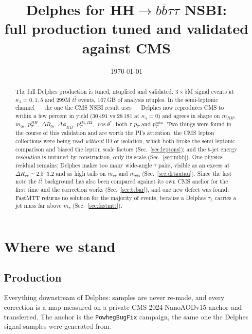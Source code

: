 \documentclass[11pt,a4paper]{article}
\title{\vspace{-1.5cm}Delphes for HH$\rightarrow b\bar b\tau\tau$ NSBI:\\
\large full production tuned and validated against CMS}
\author{}
\date{\today}
\newcommand{\tauh}{\tau_{h}}
\newcommand{\mtautau}{m_{\tau\tau}}
\newcommand{\mvis}{m_{\mathrm{vis}}}
\newcommand{\mtau}{m_{\tau}}
\newcommand{\kl}{\kappa_{\lambda}}
\newcommand{\dR}{\Delta R}
\newcommand{\ptmiss}{p_{T}^{\mathrm{miss}}}
\begin{document}
\maketitle
\vspace{-0.8cm}

\begin{abstract}
\noindent
The full Delphes production is tuned, ntuplised and validated: $3\times5$M signal events at
$\kl=0,1,5$ and $299$M $t\bar t$ events, $167\,$GB of analysis ntuples. In the
semi-leptonic channel --- the one the CMS NSBI result uses --- Delphes now reproduces CMS
to within a few percent in yield ($30\,491$ vs $28\,181$ at $\kl=0$) and agrees in shape on
$m_{HH}$, $m_{bb}$, $p_{T}^{HH}$, $\dR_{bb}$, $\Delta\phi_{HH}$, $p_{T}^{H1,H2}$,
$\cos\theta^{*}$, both $\tau$ $p_{T}$ and $\ptmiss$. Two things were found in the course of
this validation and are worth the PI's attention: the CMS lepton collections were being read
\emph{without} ID or isolation, which both broke the semi-leptonic comparison and biased the
lepton scale factors (Sec.~\ref{sec:leptons}); and the $b$-jet energy \emph{resolution} is
untuned by construction, only its scale (Sec.~\ref{sec:mbb}). One physics residual remains:
Delphes makes too many wide-angle $\tau$ pairs, visible as an excess at
$\dR_{\tau\tau}\simeq2.5$--$3.2$ and as high tails on $\mtautau$ and $\mvis$
(Sec.~\ref{sec:drtautau}). Since the last note the $t\bar t$ background has also been
compared against its own CMS anchor for the first time and the correction works
(Sec.~\ref{sec:ttbar}), and one new defect was found: FastMTT returns no solution for the
majority of events, because a Delphes $\tauh$ carries a jet mass far above $\mtau$
(Sec.~\ref{sec:fastmtt}).
\end{abstract}

\section{Where we stand}

\subsection{Production}

Everything downstream of Delphes: samples are never re-made, and every correction is a map
measured on a private CMS 2024 NanoAODv15 anchor and transferred. The anchor is the
\texttt{PowhegBugFix} campaign, the same one the Delphes signal samples were generated from.
\end{document}
